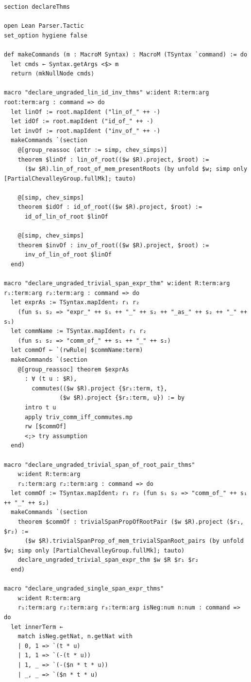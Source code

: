 \begin{Verbatim}
section declareThms

open Lean Parser.Tactic
set_option hygiene false

def makeCommands (m : MacroM Syntax) : MacroM (TSyntax `command) := do
  let cmds ← Syntax.getArgs <$> m
  return ⟨mkNullNode cmds⟩

macro "declare_ungraded_lin_id_inv_thms" w:ident R:term:arg root:term:arg : command => do
  let linOf := root.mapIdent ("lin_of_" ++ ·)
  let idOf := root.mapIdent ("id_of_" ++ ·)
  let invOf := root.mapIdent ("inv_of_" ++ ·)
  makeCommands `(section
    @[group_reassoc (attr := simp, chev_simps)]
    theorem $linOf : lin_of_root(($w $R).project, $root) :=
      ($w $R).lin_of_root_of_mem_presentRoots (by unfold $w; simp only [PartialChevalleyGroup.fullMk]; tauto)

    @[simp, chev_simps]
    theorem $idOf : id_of_root(($w $R).project, $root) :=
      id_of_lin_of_root $linOf

    @[simp, chev_simps]
    theorem $invOf : inv_of_root(($w $R).project, $root) :=
      inv_of_lin_of_root $linOf
  end)

macro "declare_ungraded_trivial_span_expr_thm" w:ident R:term:arg r₁:term:arg r₂:term:arg : command => do
  let exprAs := TSyntax.mapIdent₂ r₁ r₂
    (fun s₁ s₂ => "expr_" ++ s₁ ++ "_" ++ s₂ ++ "_as_" ++ s₂ ++ "_" ++ s₁)
  let commName := TSyntax.mapIdent₂ r₁ r₂
    (fun s₁ s₂ => "comm_of_" ++ s₁ ++ "_" ++ s₂)
  let commOf ← `(rwRule| $commName:term)
  makeCommands `(section
    @[group_reassoc] theorem $exprAs
      : ∀ (t u : $R),
        commutes(($w $R).project {$r₁:term, t},
                ($w $R).project {$r₂:term, u}) := by
      intro t u
      apply triv_comm_iff_commutes.mp
      rw [$commOf]
      <;> try assumption
  end)

macro "declare_ungraded_trivial_span_of_root_pair_thms"
    w:ident R:term:arg
    r₁:term:arg r₂:term:arg : command => do
  let commOf := TSyntax.mapIdent₂ r₁ r₂ (fun s₁ s₂ => "comm_of_" ++ s₁ ++ "_" ++ s₂)
  makeCommands `(section
    theorem $commOf : trivialSpanPropOfRootPair ($w $R).project ($r₁, $r₂) :=
      ($w $R).trivialSpanProp_of_mem_trivialSpanRoot_pairs (by unfold $w; simp only [PartialChevalleyGroup.fullMk]; tauto)
    declare_ungraded_trivial_span_expr_thm $w $R $r₁ $r₂
  end)

macro "declare_ungraded_single_span_expr_thms"
    w:ident R:term:arg
    r₁:term:arg r₂:term:arg r₃:term:arg isNeg:num n:num : command => do
  let innerTerm ←
    match isNeg.getNat, n.getNat with
    | 0, 1 => `(t * u)
    | 1, 1 => `(-(t * u))
    | 1, _ => `(-($n * t * u))
    | _, _ => `($n * t * u)


\end{Verbatim}
